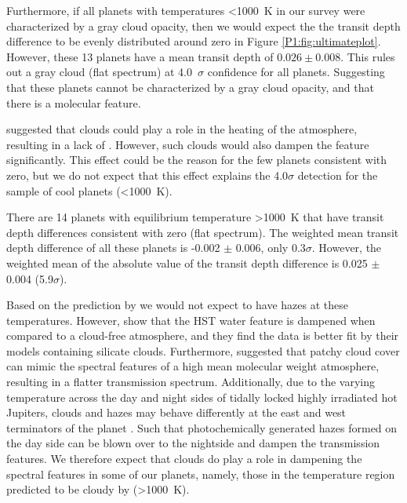 Furthermore, if all planets with temperatures <1000~K in our survey were characterized by a gray cloud opacity, then we would expect the the transit depth difference to be evenly distributed around zero in Figure \ref{P1:fig:ultimateplot}. However, these 13 planets have a mean transit depth of $0.026 \pm 0.008$. This rules out a gray cloud (flat spectrum) at 4.0~$\sigma$ confidence for all planets. Suggesting that these planets cannot be characterized by a gray cloud opacity, and that there is a molecular feature.

\citet{Molaverdikhani2020} suggested that clouds could play a role in the heating of the atmosphere, resulting in a lack of . However, such clouds would also dampen the  feature significantly. This effect could be the reason for the few planets consistent with zero, but we do not expect that this effect explains the 4.0$\sigma$ detection for the sample of cool planets (<1000~K).

There are 14 planets with equilibrium temperature >1000~K that have transit depth differences consistent with zero (flat spectrum). The weighted mean transit depth difference of all these planets is -0.002 $\pm$ 0.006, only 0.3$\sigma$. However, the weighted mean of the absolute value of the transit depth difference is 0.025 $\pm$ 0.004 (5.9$\sigma$).


Based on the prediction by \citet{Morley2015} we would not expect to have hazes at these temperatures. However, \citet{Gao2020} show that the HST water feature is dampened when compared to a cloud-free atmosphere, and they find the data is better fit by their models containing silicate clouds. Furthermore, \citep{Line2016a} suggested that patchy cloud cover can mimic the spectral features of a high mean molecular weight atmosphere, resulting in a flatter transmission spectrum. Additionally, due to the varying temperature across the day and night sides of tidally locked highly irradiated hot Jupiters, clouds and hazes may behave differently at the east and west terminators of the planet \citep{Kempton2017b}. Such that photochemically generated hazes formed on the day side can be blown over to the nightside and dampen the transmission features. We therefore expect that clouds do play a role in dampening the spectral features in some of our planets, namely, those in the temperature region predicted to be cloudy by \citet{Gao2020} (>1000~K).

